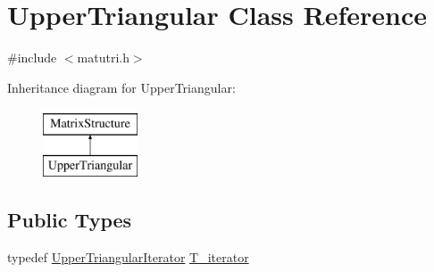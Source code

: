 \hypertarget{classUpperTriangular}{}\section{Upper\+Triangular Class Reference}
\label{classUpperTriangular}


{\ttfamily \#include $<$matutri.\+h$>$}

Inheritance diagram for Upper\+Triangular\+:\begin{figure}[H]
\begin{center}
\leavevmode
\includegraphics[height=2.000000cm]{classUpperTriangular}
\end{center}
\end{figure}
\subsection*{Public Types}
\begin{DoxyCompactItemize}
\item 
typedef \hyperlink{classUpperTriangularIterator}{Upper\+Triangular\+Iterator} \hyperlink{classUpperTriangular_ab82c2e760411603c189ea24b5d67b499}{T\+\_\+iterator}
\end{DoxyCompactItemize}
